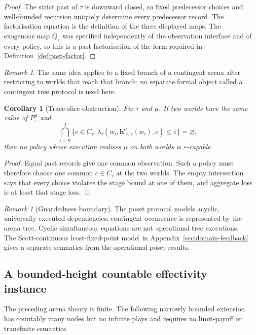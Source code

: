 \documentclass[11pt]{article}
\theoremstyle{plain}
\newtheorem{corollary}[theorem]{Corollary}
\theoremstyle{definition}
\theoremstyle{remark}
\newtheorem{remark}[theorem]{Remark}
\newcommand{\eps}{\varepsilon}
\begin{document}
\begin{proof}
The strict past of $\tau$ is downward closed, so fixed predecessor choices and
well-founded recursion uniquely determine every predecessor record. The
factorisation equation is the definition of the three displayed maps. The
exogenous map $Q_\tau$ was specified independently of the observation interface
and of every policy, so this is a past factorisation of the form required in
Definition~\ref{def:past-factor}.
\end{proof}

\begin{remark}
The same idea applies to a fixed branch of a contingent arena after restricting
to worlds that reach that branch; no separate formal object called a contingent
tree protocol is used here.
\end{remark}

\begin{corollary}[Trace-slice obstruction]
\label{cor:trace-slice-obstruction}
Fix $\tau$ and $\mu$. If two worlds have the same value of
$P_\tau^\mu$ and
\[
\bigcap_{i=0}^1
\{c\in C_\tau:
\lambda_\tau(w_i,\mathbf h_{<\tau}^\mu(w_i),c)\le\eps\}
=\varnothing,
\]
then no policy whose execution realises $\mu$ on both worlds is
$\eps$-capable.
\end{corollary}

\begin{proof}
Equal past records give one common observation. Such a policy must therefore
choose one common $c\in C_\tau$ at the two worlds. The empty intersection says
that every choice violates the stage bound at one of them, and aggregate loss is
at least that stage loss.
\end{proof}

\begin{remark}[Guardedness boundary]
The poset protocol models acyclic, universally executed dependencies; contingent
occurrence is represented by the arena tree. Cyclic simultaneous equations are
not operational tree executions. The Scott-continuous least-fixed-point model in
Appendix~\ref{sec:domain-feedback} gives a separate semantics from the
operational poset results.
\end{remark}

\subsection{A bounded-height countable effectivity instance}

The preceding arena theory is finite. The following narrowly bounded extension
has countably many nodes but no infinite plays and requires no limit-payoff or
transfinite semantics.
\end{document}
